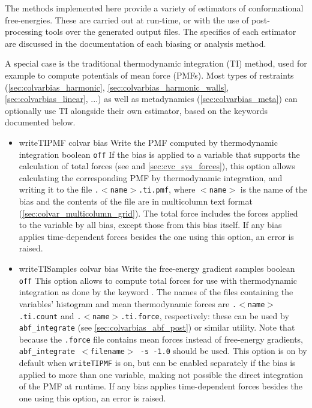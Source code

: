 
The methods implemented here provide a variety of estimators of conformational free-energies.
These are carried out at run-time, or with the use of post-processing tools over the generated output files.
The specifics of each estimator are discussed in the documentation of each biasing or analysis method.

A special case is the traditional thermodynamic integration (TI) method, used for example to compute potentials of mean force (PMFs).
Most types of restraints (\ref{sec:colvarbias_harmonic}, \ref{sec:colvarbias_harmonic_walls}, \ref{sec:colvarbias_linear}, ...) as well as metadynamics (\ref{sec:colvarbias_meta}) can optionally use TI alongside their own estimator, based on the keywords documented below.

\begin{itemize}

\item %
  \keydef
    {writeTIPMF}{%
    colvar bias}{%
    Write the PMF computed by thermodynamic integration}{%
    boolean}{%
    \texttt{off}}{%
    If the bias is applied to a variable that supports the calculation of total forces (see  and \ref{sec:cvc_sys_forces}), this option allows calculating the corresponding PMF by thermodynamic integration, and writing it to the file \outputName{}\texttt{.$<$name$>$.ti.pmf}, where \texttt{$<$name$>$} is the name of the bias and the contents of the file are in multicolumn text format (\ref{sec:colvar_multicolumn_grid}).
    The total force includes the forces applied to the variable by all bias, except those from this bias itself.
    If any bias applies time-dependent forces besides the one using this option, an error is raised.
}


\item %
  \keydef
    {writeTISamples}{%
    colvar bias}{%
    Write the free-energy gradient samples}{%
    boolean}{%
    \texttt{off}}{%
    This option allows to compute total forces for use with thermodynamic integration as done by the keyword .
    The names of the files containing the variables' histogram and mean thermodynamic forces are \outputName\texttt{.$<$name$>$.ti.count} and \outputName\texttt{.$<$name$>$.ti.force}, respectively: these can be used by \texttt{abf\_integrate} (see \ref{sec:colvarbias_abf_post}) or similar utility.
    Note that because the \texttt{.force} file contains mean forces instead of free-energy gradients, \texttt{abf\_integrate $<$filename$>$ -s -1.0} should be used.
    This option is on by default when \texttt{writeTIPMF} is on, but can be enabled separately if the bias is applied to more than one variable, making not possible the direct integration of the PMF at runtime.
    If any bias applies time-dependent forces besides the one using this option, an error is raised.
}

\end{itemize}

